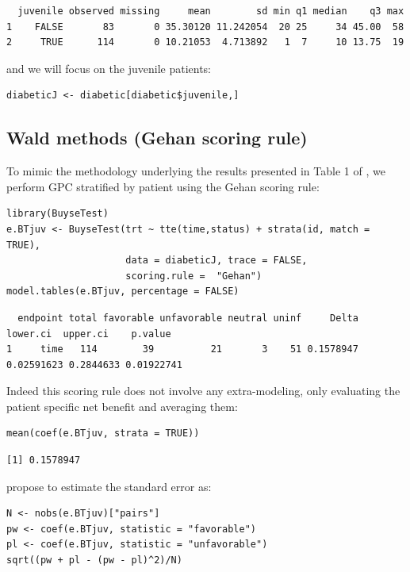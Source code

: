 \documentclass[12pt]{article}
\begin{document}
\begin{verbatim}
  juvenile observed missing     mean        sd min q1 median    q3 max
1    FALSE       83       0 35.30120 11.242054  20 25     34 45.00  58
2     TRUE      114       0 10.21053  4.713892   1  7     10 13.75  19
\end{verbatim}


and we will focus on the juvenile patients:
\lstset{language=r,label= ,caption= ,captionpos=b,numbers=none}
\begin{lstlisting}
diabeticJ <- diabetic[diabetic$juvenile,]
\end{lstlisting}

\subsection{Wald methods (Gehan scoring rule)}
\label{sec:org90604f4}

To mimic the methodology underlying the results presented in Table 1
of \cite{matsouaka2022robust}, we perform GPC stratified by patient
using the Gehan scoring rule:
\lstset{language=r,label= ,caption= ,captionpos=b,numbers=none}
\begin{lstlisting}
library(BuyseTest)
e.BTjuv <- BuyseTest(trt ~ tte(time,status) + strata(id, match = TRUE), 
                     data = diabeticJ, trace = FALSE,
                     scoring.rule =  "Gehan")
model.tables(e.BTjuv, percentage = FALSE)
\end{lstlisting}

\begin{verbatim}
  endpoint total favorable unfavorable neutral uninf     Delta   lower.ci  upper.ci    p.value
1     time   114        39          21       3    51 0.1578947 0.02591623 0.2844633 0.01922741
\end{verbatim}


Indeed this scoring rule does not involve any extra-modeling, only
evaluating the patient specific net benefit and averaging them:
\lstset{language=r,label= ,caption= ,captionpos=b,numbers=none}
\begin{lstlisting}
mean(coef(e.BTjuv, strata = TRUE))
\end{lstlisting}

\begin{verbatim}
[1] 0.1578947
\end{verbatim}


\cite{matsouaka2022robust} propose to estimate the standard error as:
\lstset{language=r,label= ,caption= ,captionpos=b,numbers=none}
\begin{lstlisting}
N <- nobs(e.BTjuv)["pairs"]
pw <- coef(e.BTjuv, statistic = "favorable")
pl <- coef(e.BTjuv, statistic = "unfavorable")
sqrt((pw + pl - (pw - pl)^2)/N)
\end{lstlisting}
\end{document}
